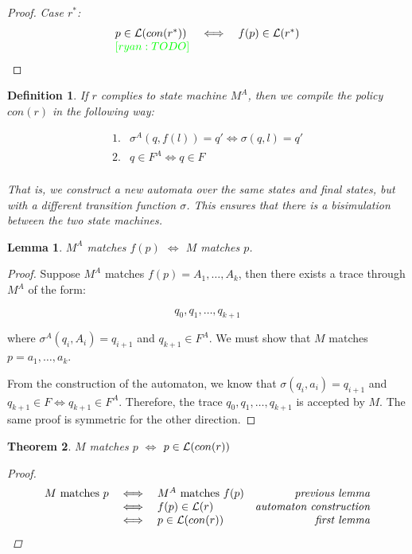 \documentclass[twocolumn]{sig-alternate-10pt}
\newcommand{\ryan}[1]{\textcolor{green}{[ryan: #1]}}
\newtheorem{thm}{Theorem}[section]
\newtheorem{defn}{Definition}
\newtheorem{lem}[thm]{Lemma}
\begin{document}
\begin{proof}
\emph{Case $r^*$:}
  \[ \begin{array}{lll}
    p \in \Lang(con(r^*)) &\iff& f(p) \in \Lang(r^*) \\
    \ryan{TODO} & & \\
  \end{array} \]

\end{proof}



\begin{defn}
If $r$ complies to state machine $M^A$, then we compile the policy $con(r)$ in the following way:

  \[ \begin{array}{ll}
    1. & \sigma^A(q,f(l)) = q' \iff \sigma(q,l) = q' \\
    2. & q \in F^A \iff q \in F \\
  \end{array} \]

That is, we construct a new automata over the same states and final states, but with a different transition function $\sigma$. This ensures that there is a bisimulation between the two state machines.

\end{defn}


\begin{lem}
  $M^A$ matches $f(p)$ $\iff$ $M$ matches $p$.
\end{lem}

\begin{proof}
  Suppose $M^A$ matches $f(p) = A_1, \dots, A_k$, then there exists a trace through $M^A$ of the form:

  $$q_0, q_1, \dots, q_{k+1}$$

  where $\sigma^A(q_i, A_i) = q_{i+1}$ and $q_{k+1} \in F^A$. We must show that $M$ matches $p = a_1, \dots, a_k$. 

  From the construction of the automaton, we know that $\sigma(q_i, a_i) = q_{i+1}$ and $q_{k+1} \in F \iff q_{k+1} \in F^A$. Therefore, the trace $q_0, q_1, \dots, q_{k+1}$ is accepted by $M$. 
  The same proof is symmetric for the other direction.
\end{proof}


\begin{thm}
  $M$ matches $p$ $\iff$ $p \in \mathcal{L}(con(r))$
  \begin{proof}
    \[ \begin{array}{lllr}
      M ~\text{matches}~ p &\iff& M^A ~\text{matches}~ f(p) & \textit{previous lemma} \\
                         &\iff& f(p) \in \mathcal{L}(r) & \textit{automaton construction} \\
                         &\iff& p \in \mathcal{L}(con(r)) & \textit{first lemma} \\
    \end{array} \]

  \end{proof}
\end{thm}
\end{document}
